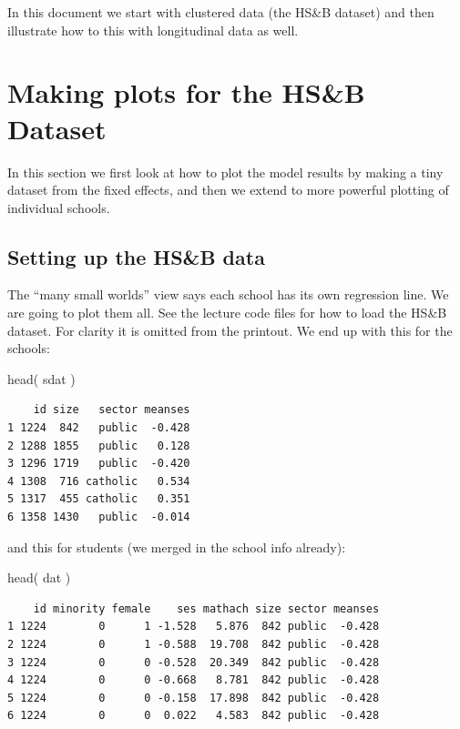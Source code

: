 \documentclass[
  letterpaper,
  DIV=11,
  numbers=noendperiod]{scrreprt}
\newenvironment{Shaded}{\begin{snugshade}}{\end{snugshade}}
\newcommand{\FunctionTok}[1]{\textcolor[rgb]{0.02,0.16,0.49}{#1}}
\newcommand{\NormalTok}[1]{\textcolor[rgb]{0.00,0.44,0.13}{#1}}
\begin{document}
In this document we start with clustered data (the HS\&B dataset) and
then illustrate how to this with longitudinal data as well.

\hypertarget{making-plots-for-the-hsb-dataset}{%
\section{Making plots for the HS\&B
Dataset}\label{making-plots-for-the-hsb-dataset}}

In this section we first look at how to plot the model results by making
a tiny dataset from the fixed effects, and then we extend to more
powerful plotting of individual schools.

\hypertarget{setting-up-the-hsb-data}{%
\subsection{Setting up the HS\&B data}\label{setting-up-the-hsb-data}}

The ``many small worlds'' view says each school has its own regression
line. We are going to plot them all. See the lecture code files for how
to load the HS\&B dataset. For clarity it is omitted from the printout.
We end up with this for the schools:

\begin{Shaded}
\begin{Highlighting}[]
\FunctionTok{head}\NormalTok{( sdat )}
\end{Highlighting}
\end{Shaded}

\begin{verbatim}
    id size   sector meanses
1 1224  842   public  -0.428
2 1288 1855   public   0.128
3 1296 1719   public  -0.420
4 1308  716 catholic   0.534
5 1317  455 catholic   0.351
6 1358 1430   public  -0.014
\end{verbatim}

and this for students (we merged in the school info already):

\begin{Shaded}
\begin{Highlighting}[]
\FunctionTok{head}\NormalTok{( dat )}
\end{Highlighting}
\end{Shaded}

\begin{verbatim}
    id minority female    ses mathach size sector meanses
1 1224        0      1 -1.528   5.876  842 public  -0.428
2 1224        0      1 -0.588  19.708  842 public  -0.428
3 1224        0      0 -0.528  20.349  842 public  -0.428
4 1224        0      0 -0.668   8.781  842 public  -0.428
5 1224        0      0 -0.158  17.898  842 public  -0.428
6 1224        0      0  0.022   4.583  842 public  -0.428
\end{verbatim}
\end{document}
